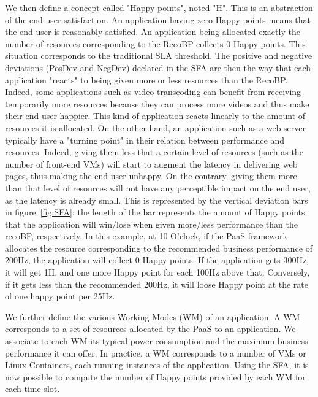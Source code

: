 We then define a concept called "Happy points", noted "H".
This is an abstraction of the end-user satisfaction.
An application having zero Happy points means that the end user is reasonably satisfied.
An application being allocated exactly the number of resources corresponding to the RecoBP collects 0 Happy points.
This situation corresponds to the traditional SLA threshold.
The positive and negative deviations (PosDev and NegDev) declared in the SFA are then the way that each application "reacts" to being given more or less resources than the RecoBP.
Indeed, some applications such as video transcoding can benefit from receiving temporarily more resources because they can process more videos and thus make their end user happier. 
This kind of application reacts linearly to the amount of resources it is allocated.
On the other hand, an application such as a web server typically have a "turning point" in their relation between performance and resources.
Indeed, giving them less that a certain level of resources (such as the number of front-end VMs) will start to augment the latency in delivering web pages, thus making the end-user unhappy.
On the contrary, giving them more than that level of resources will not have any perceptible impact on the end user, as the latency is already small.
This is represented by the vertical deviation bars in figure~\ref{fig:SFA}: the length of the bar represents the amount of Happy points that the application will win/lose when given more/less performance than the recoBP, respectively.
In this example, at 10 O’clock, if the PaaS framework allocates the resource corresponding to the recommended business performance of 200Hz, the application will collect 0 Happy points.
If the application gets 300Hz, it will get 1H, and one more Happy point for each 100Hz above that.
Conversely, if it gets less than the recommended 200Hz, it will loose Happy point at the rate of one happy point per 25Hz.

We further define the various Working Modes (WM) of an application.
A WM corresponds to a set of resources allocated by the PaaS to an application.
We associate to each WM its typical power consumption and the maximum business performance it can offer.
In practice, a WM corresponds to a number of VMs or Linux Containers, each running instances of the application.
Using the SFA, it is now possible to compute the number of Happy points provided by each WM for each time slot.











